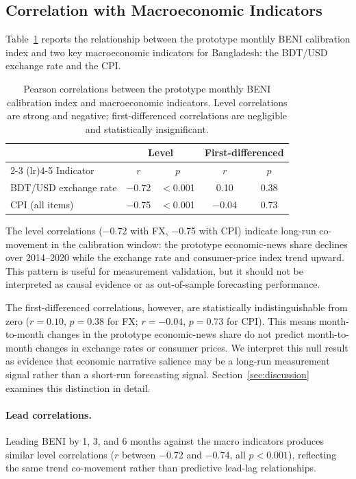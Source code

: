 \subsection{Correlation with Macroeconomic Indicators}

Table~\ref{tab:correlations} reports the relationship between the prototype monthly BENI calibration index and two key macroeconomic indicators for Bangladesh: the BDT/USD exchange rate and the CPI.

\begin{table}[h]
\centering
\begin{tabular}{lcccc}
\toprule
 & \multicolumn{2}{c}{Level} & \multicolumn{2}{c}{First-differenced} \\
\cmidrule(lr){2-3} \cmidrule(lr){4-5}
Indicator & $r$ & $p$ & $r$ & $p$ \\
\midrule
BDT/USD exchange rate & $-$0.72 & $<$0.001 & 0.10 & 0.38 \\
CPI (all items) & $-$0.75 & $<$0.001 & $-$0.04 & 0.73 \\
\bottomrule
\end{tabular}
\caption{Pearson correlations between the prototype monthly BENI calibration index and macroeconomic indicators. Level correlations are strong and negative; first-differenced correlations are negligible and statistically insignificant.}
\label{tab:correlations}
\end{table}

The level correlations ($-$0.72 with FX, $-$0.75 with CPI) indicate long-run co-movement in the calibration window: the prototype economic-news share declines over 2014--2020 while the exchange rate and consumer-price index trend upward. This pattern is useful for measurement validation, but it should not be interpreted as causal evidence or as out-of-sample forecasting performance.

The first-differenced correlations, however, are statistically indistinguishable from zero ($r = 0.10$, $p = 0.38$ for FX; $r = -0.04$, $p = 0.73$ for CPI). This means month-to-month changes in the prototype economic-news share do not predict month-to-month changes in exchange rates or consumer prices. We interpret this null result as evidence that economic narrative salience may be a long-run measurement signal rather than a short-run forecasting signal. Section~\ref{sec:discussion} examines this distinction in detail.

\paragraph{Lead correlations.} Leading BENI by 1, 3, and 6 months against the macro indicators produces similar level correlations ($r$ between $-$0.72 and $-$0.74, all $p < 0.001$), reflecting the same trend co-movement rather than predictive lead-lag relationships.
